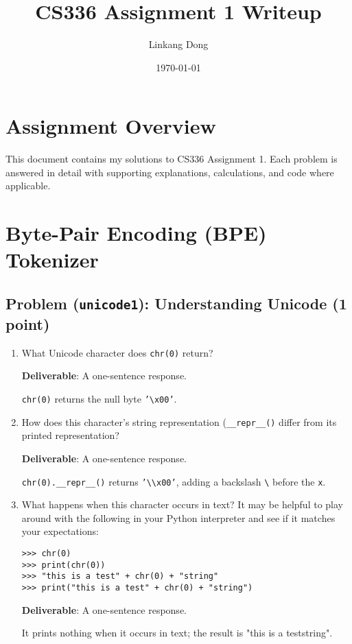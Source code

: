 \documentclass{article}
\title{CS336 Assignment 1 Writeup}
\author{Linkang Dong}
\date{\today}
\newcounter{problem}
\newcommand{\problem}[2]{
    \stepcounter{problem}
    \subsection{Problem (\texttt{#1}): #2}
    \vspace{-1.5em} %
    \noindent
}
\begin{document}
\maketitle

\tableofcontents

\section{Assignment Overview}
\vspace{-1em}

This document contains my solutions to CS336 Assignment 1. Each problem is answered in detail with supporting explanations, calculations, and code where applicable.

\section{Byte-Pair Encoding (BPE) Tokenizer}
\vspace{-1em}

\problem{unicode1}{Understanding Unicode (1 point)}

\begin{enumerate}[label=(\alph*)]
    \item {What Unicode character does \texttt{chr(0)} return?}
    
    {\textbf{Deliverable}: A one-sentence response.}
    
    \begin{answer}
    \texttt{chr(0)} returns the null byte \texttt{'\textbackslash x00'}.
    \end{answer}
    
    \item {How does this character's string representation (\texttt{\_\_repr\_\_()} differ from its printed representation?}
    
    {\textbf{Deliverable}: A one-sentence response.}
    
    \begin{answer}
    \texttt{chr(0).\_\_repr\_\_()} returns \texttt{'\textbackslash\textbackslash x00'}, adding a backslash \texttt{\textbackslash} before the \texttt{x}.
    \end{answer}
    
    \item {What happens when this character occurs in text? It may be helpful to play around with the following in your Python interpreter and see if it matches your expectations:}
    
    \begin{lstlisting}
>>> chr(0)
>>> print(chr(0))
>>> "this is a test" + chr(0) + "string"
>>> print("this is a test" + chr(0) + "string")
    \end{lstlisting}
    
    {\textbf{Deliverable}: A one-sentence response.}
    
    \begin{answer}
    It prints nothing when it occurs in text; the result is "this is a teststring".
    \end{answer}
\end{enumerate}
\end{document}
